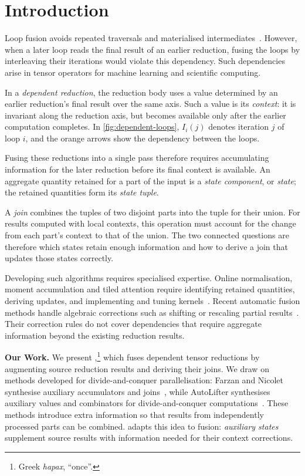 \section{Introduction}\label{sec:intro}

Loop fusion avoids repeated traversals and materialised intermediates~\citep{halide,tvm}.
However, when a later loop reads the final result of an earlier reduction, fusing the loops by interleaving their iterations would violate this dependency.
Such dependencies arise in tensor operators for machine learning and scientific computing.


In a \emph{dependent reduction}, the reduction body uses a value determined by an earlier reduction's final result over the same axis.
Such a value is its \emph{context}: it is invariant along the reduction axis, but becomes available only after the earlier computation completes.
In \cref{fig:dependent-loops}, $I_i(j)$ denotes iteration $j$ of loop $i$, and the orange arrows show the dependency between the loops.

Fusing these reductions into a single pass therefore requires accumulating information for the later reduction before its final context is available.
An aggregate quantity retained for a part of the input is a \emph{state component}, or \emph{state}; the retained quantities form its \emph{state tuple}.

A \emph{join} combines the tuples of two disjoint parts into the tuple for their union.
For results computed with local contexts, this operation must account for the change from each part's context to that of the union.
The two connected questions are therefore which states retain enough information and how to derive a join that updates those states correctly.

Developing such algorithms requires specialised expertise.
Online normalisation, moment accumulation and tiled attention require identifying retained quantities, deriving updates, and implementing and tuning kernels~\citep{milakov,chan,pebay,flashattention}.
Recent automatic fusion methods handle algebraic corrections such as shifting or rescaling partial results~\citep{neptune,redfuser}.
Their correction rules do not cover dependencies that require aggregate information beyond the existing reduction results.

\textbf{Our Work.}
We present \sys,\footnote{Greek \emph{hapax}, ``once''.} which fuses dependent tensor reductions by augmenting source reduction results and deriving their joins.
We draw on methods developed for divide-and-conquer parallelisation: Farzan and Nicolet synthesise auxiliary accumulators and joins~\citep{farzan17,farzan21}, while AutoLifter synthesises auxiliary values and combinators for divide-and-conquer computations~\citep{autolifter}.
These methods introduce extra information so that results from independently processed parts can be combined.
\sys adapts this idea to fusion: \emph{auxiliary states} supplement source results with information needed for their context corrections.

